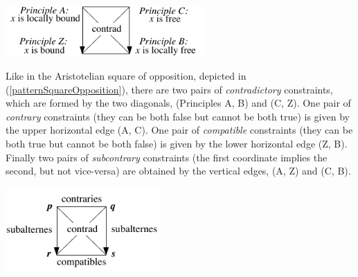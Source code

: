 \documentclass[output=paper
,modfonts
,nonflat]{langsci/langscibook}
\begin{document}
\begin{exe}
\ex
\label{bindingSquareOpposition}
\end{exe}
\vspace{-7mm}
\centerline{\includegraphics[width=18pc]{figures/bindingSquareOpposition.pdf}}



Like in the Aristotelian square of opposition, depicted in (\ref{patternSquareOpposition}), there are two pairs of \emph{contradictory} constraints, which are formed
by the two diagonals, (Principles A, B) and (C, Z). One pair of \emph{contrary}
constraints (they can be both false but cannot be both true) is given
by the upper horizontal edge (A, C).  One pair of \emph{compatible}
constraints (they can be both true but cannot be both false) is given
by the lower horizontal edge (Z, B). Finally two pairs of
\emph{subcontrary} constraints (the first coordinate implies the second,
but not vice-versa) are obtained by the vertical edges, (A, Z) and (C,
B).




\begin{samepage}
\begin{exe}
\ex
\label{patternSquareOpposition}
\end{exe}
\vspace{-10mm}
\centerline{\includegraphics[width=14pc]{figures/patternSquareOpposition.pdf}}
\end{samepage}
\end{document}
